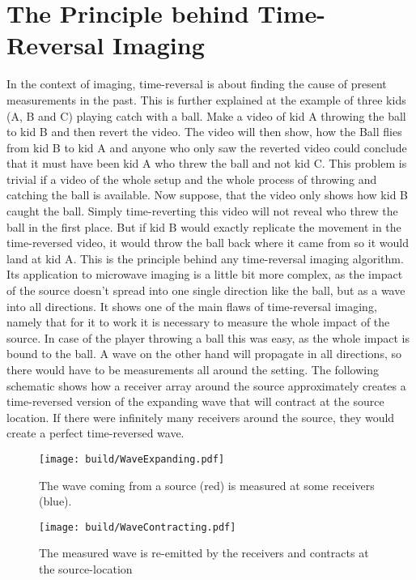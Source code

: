 \section{The Principle behind Time-Reversal Imaging}
In the context of imaging, time-reversal is about finding the cause of present measurements in the past.
This is further explained at the example of three kids (A, B and C) playing catch with a ball.
Make a video of kid A throwing the ball to kid B and then revert the video.
The video will then show, how the Ball flies from kid B to kid A and anyone who only saw the reverted video could conclude that it must have been kid A who threw the ball and not kid C.
This problem is trivial if a video of the whole setup and the whole process of throwing and catching the ball is available.
Now suppose, that the video only shows how kid B caught the ball.
Simply time-reverting this video will not reveal who threw the ball in the first place.
But if kid B would exactly replicate the movement in the time-reversed video, it would throw the ball back where it came from so it would land at kid A.
This is the principle behind any time-reversal imaging algorithm.
Its application to microwave imaging is a little bit more complex, as the impact of the source doesn't spread into one single direction like the ball, but as a wave into all directions.
It shows one of the main flaws of time-reversal imaging, namely that for it to work it is necessary to measure the whole impact of the source.
In case of the player throwing a ball this was easy, as the whole impact is bound to the ball.
A wave on the other hand will propagate in all directions, so there would have to be measurements all around the setting.
The following schematic shows how a receiver array around the source approximately creates a time-reversed version of the expanding wave that will contract at the source location.
If there were infinitely many receivers around the source, they would create a perfect time-reversed wave.

\begin{figure}[ht]
    \centering
    \begin{minipage}{0.45\textwidth}
        \centering
        \texttt{[image: build/WaveExpanding.pdf]}
        \caption*{The wave coming from a source (red) is measured at some receivers (blue).}\label{fig:WaveTimeReversal}
    \end{minipage}\hfill
    \begin{minipage}{0.45\textwidth}
        \centering
        \texttt{[image: build/WaveContracting.pdf]}
        \caption*{The measured wave is re-emitted by the receivers and contracts at the source-location}\label{fig:WaveTimeReversalContraction}
    \end{minipage}
\end{figure}